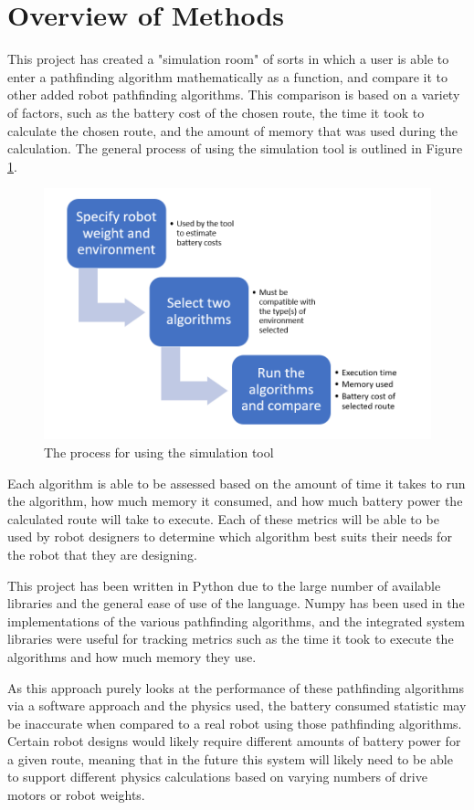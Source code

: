 \section{Overview of Methods}
This project has created a "simulation room" of sorts in which a user is able to enter a pathfinding algorithm mathematically as a function, and compare it to other added robot pathfinding algorithms. This comparison is based on a variety of factors, such as the battery cost of the chosen route, the time it took to calculate the chosen route, and the amount of memory that was used during the calculation. The general process of using the simulation tool is outlined in Figure \ref{fig:Usage}.
\begin{figure}[H]
    \centering
    \includegraphics[width=5in]{../images/ProposalMethodFlowchart}
    \caption{The process for using the simulation tool}
    \label{fig:Usage}
\end{figure}
Each algorithm is able to be assessed based on the amount of time it takes to run the algorithm, how much memory it consumed, and how much battery power the calculated route will take to execute. Each of these metrics will be able to be used by robot designers to determine which algorithm best suits their needs for the robot that they are designing.
\par
This project has been written in Python due to the large number of available libraries and the general ease of use of the language. Numpy \cite{numpy_2021} has been used in the implementations of the various pathfinding algorithms, and the integrated system libraries were useful for tracking metrics such as the time it took to execute the algorithms and how much memory they use.
\par
As this approach purely looks at the performance of these pathfinding algorithms via a software approach and the physics used, the battery consumed statistic may be inaccurate when compared to a real robot using those pathfinding algorithms. Certain robot designs would likely require different amounts of battery power for a given route, meaning that in the future this system will likely need to be able to support different physics calculations based on varying numbers of drive motors or robot weights.
